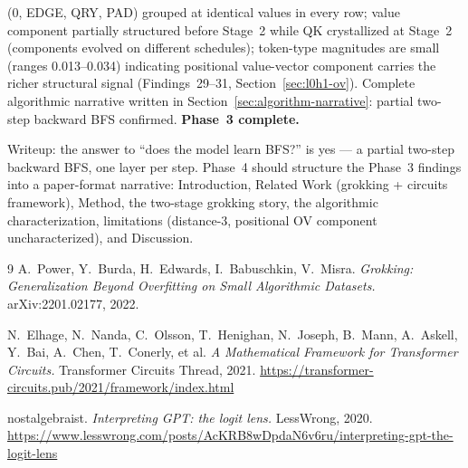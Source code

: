 \documentclass[11pt, a4paper]{article}
\begin{document}
\begin{description}
\begin{description}
        (0, EDGE, QRY, PAD) grouped at identical values in every row; value
        component partially structured before Stage~2 while QK crystallized
        at Stage~2 (components evolved on different schedules); token-type
        magnitudes are small (ranges 0.013--0.034) indicating positional
        value-vector component carries the richer structural signal
        (Findings~29--31, Section~\ref{sec:l0h1-ov}).
        Complete algorithmic narrative written in
        Section~\ref{sec:algorithm-narrative}: partial two-step backward BFS
        confirmed.  \textbf{Phase~3 complete.}
    \end{description}
  \item[Phase 4 (TODO)] Writeup: the answer to ``does the model learn BFS?''
    is yes --- a partial two-step backward BFS, one layer per step.  Phase~4
    should structure the Phase~3 findings into a paper-format narrative:
    Introduction, Related Work (grokking + circuits framework), Method, the
    two-stage grokking story, the algorithmic characterization, limitations
    (distance-3, positional OV component uncharacterized), and Discussion.
\end{description}

\begin{thebibliography}{9}
  A.\ Power, Y.\ Burda, H.\ Edwards, I.\ Babuschkin, V.\ Misra.
  \textit{Grokking: Generalization Beyond Overfitting on Small Algorithmic
  Datasets.}
  arXiv:2201.02177, 2022.

  N.\ Elhage, N.\ Nanda, C.\ Olsson, T.\ Henighan, N.\ Joseph, B.\ Mann,
  A.\ Askell, Y.\ Bai, A.\ Chen, T.\ Conerly, et al.
  \textit{A Mathematical Framework for Transformer Circuits.}
  Transformer Circuits Thread, 2021.
  \url{https://transformer-circuits.pub/2021/framework/index.html}

  nostalgebraist.
  \textit{Interpreting GPT: the logit lens.}
  LessWrong, 2020.
  \url{https://www.lesswrong.com/posts/AcKRB8wDpdaN6v6ru/interpreting-gpt-the-logit-lens}
\end{thebibliography}
\end{document}
